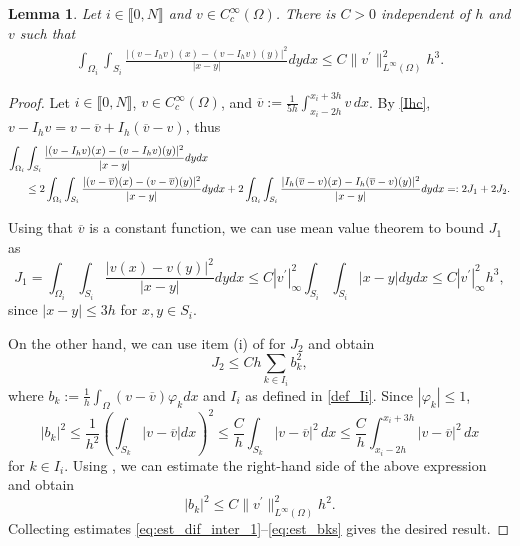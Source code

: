 \documentclass[11 pt]{article}
\newcommand\inter[1]{\llbracket #1\rrbracket}
\newtheorem{lemma}[theorem]{Lemma}
\numberwithin{equation}{section}
\begin{document}
\begin{lemma}\label{lem:stab_dif_interp}
Let $i\in\inter{0,N}$ and $v\in C_c^\infty(\Omega)$. There is $C>0$ independent of $h$ and $v$ such that
\begin{align}\label{eq:approxim_estimate}
    \int_{\Omega_i}\int_{S_i}\frac{|(v-I_h v)(x)-(v-I_h v)(y)|^2}{|x-y|}dy dx \leq C \|v^\prime\|^2_{L^\infty(\Omega)} h^3.
\end{align}
\end{lemma}
%
\begin{proof}
Let $i\in\inter{0,N}$, $v\in C_c^\infty(\Omega)$, and $\overline {v}:=\frac{1}{5h}\int_{x_i-2h}^{x_i+3h}v\,dx$.
By \eqref{Ihc}, $v-I_h v=v-\overline{v}+I_h(\overline v - v)$, thus
%
\begin{align}\notag
    \int_{\Omega_i}&\int_{S_i}\frac{|(v-I_h v)(x)-(v-I_h v)(y)|^2}{|x-y|} dy dx \\
    &\leq 2\int_{\Omega_i}\int_{S_i}\frac{|(v-\overline{v})(x)-(v-\overline{v})(y)|^2}{|x-y|}dy dx + 2 \int_{\Omega_i}\int_{S_i}\frac{|I_h(\overline v-{v})(x)-I_h(\overline v-{v})(y)|^2}{|x-y|}dy dx =:2J_1+2J_2.\label{eq:est_dif_inter_1}
\end{align}
%

Using that $\overline v$ is a constant function, we can use mean value theorem to bound $J_1$ as
%
\begin{equation}\label{eq:est_J1}
    J_1 = \int_{\Omega_i}\int_{S_i}\frac{|v(x)-v(y)|^2}{|x-y|}dy dx \leq C |v^\prime|^2_{\infty}\int_{S_i}\int_{S_i}|x-y|dy dx \leq C{|v^\prime|^2_{\infty}}h^3,
\end{equation}
since $|x-y|\leq 3h$ for $x,y\in S_i$.

On the other hand, we can use item (i) of  for $J_2$ and obtain
%
\begin{equation}\label{eq:est_J2}
    J_2 \leq Ch\sum_{k\in I_i} b_k^2,
\end{equation}
%
where $b_k:=\frac{1}{h}\int_{\Omega}(v-\overline v)\varphi_k dx$ and $I_i$ as defined in \eqref{def_Ii}. Since $|\varphi_k|\leq 1$,
\begin{equation}\label{abk}
    |b_k|^2
    \leq \frac{1}{h^2}\left(\int_{S_k} |v-\overline v|dx\right)^2
    \leq \frac{C}{h}\int_{S_k}|v-\overline{v}|^2\, dx
    \leq \frac{C}{h}\int_{x_i-2h}^{x_i+3h}|v-\overline{v}|^2\, dx
\end{equation}
for $k\in I_i.$ Using , we can estimate the right-hand side of the above expression and obtain
%
\begin{equation}\label{eq:est_bks}
    |b_k|^2\leq C{\|v^\prime\|^2_{L^\infty(\Omega)}}h^2.
\end{equation}
%
Collecting estimates \eqref{eq:est_dif_inter_1}--\eqref{eq:est_bks} gives the desired result.
\end{proof}
\end{document}
